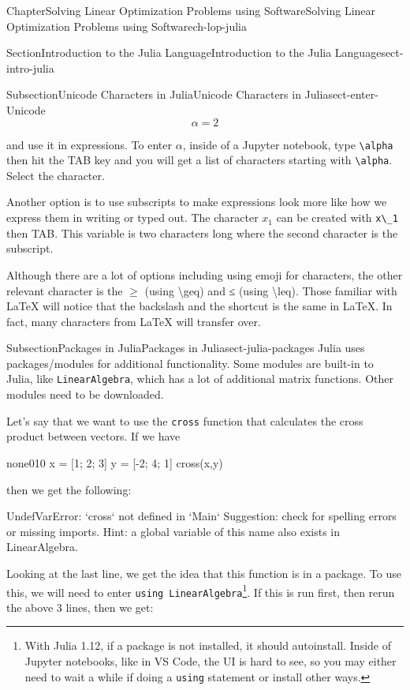 \documentclass[oneside,10pt,]{book}
\newcommand{\mono}[1]{\texttt{#1}}
\numberwithin{equation}{section}
\begin{document}
\begin{chapterptx}{Chapter}{Solving Linear Optimization Problems using Software}{}{Solving Linear Optimization Problems using Software}{}{}{ch-lop-julia}
\begin{sectionptx}{Section}{Introduction to the Julia Language}{}{Introduction to the Julia Language}{}{}{sect-intro-julia}
\begin{subsectionptx}{Subsection}{Unicode Characters in Julia}{}{Unicode Characters in Julia}{}{}{sect-enter-Unicode}
%
\begin{equation*}
\alpha = 2
\end{equation*}
%
\par
and use it in expressions. To enter \(\alpha\), inside of a Jupyter notebook, type \mono{\textbackslash{}alpha} then hit the TAB key and you will get a list of characters starting with \mono{\textbackslash{}alpha}. Select the character.%
\par
Another option is to use subscripts to make expressions look more like how we express them in writing or typed out. The character \(x_1\) can be created with \mono{x\textbackslash{}\_1} then TAB. This variable is two characters long where the second character is the subscript.%
\par
Although there are a lot of options including using emoji for characters, the other relevant character is the \(\geq\) (using \textbackslash{}geq) and ≤ (using \textbackslash{}leq). Those familiar with LaTeX will notice that the backslash and the shortcut is the same in LaTeX. In fact, many characters from LaTeX will transfer over.%
\end{subsectionptx}
%
%
\typeout{************************************************}
\typeout{************************************************}
%
\begin{subsectionptx}{Subsection}{Packages in Julia}{}{Packages in Julia}{}{}{sect-julia-packages}
Julia uses packages\slash{}modules for additional functionality. Some modules are built-in to Julia, like \mono{LinearAlgebra}, which has a lot of additional matrix functions. Other modules need to be downloaded.%
\par
Let's say that we want to use the \mono{cross} function that calculates the cross product between vectors. If we have%
\begin{program}{none}{0}{1}{0}
x = [1; 2; 3]
y = [-2; 4; 1]
cross(x,y)
\end{program}
then we get the following:%
\par
%
\begin{codedisplay}
UndefVarError: `cross` not defined in `Main`
  Suggestion: check for spelling errors or missing imports.
  Hint: a global variable of this name also exists in LinearAlgebra.
\end{codedisplay}
%
\par
Looking at the last line, we get the idea that this function is in a package. To use this, we will need to enter \mono{using LinearAlgebra}\footnote{With Julia 1.12, if a package is not installed, it should autoinstall. Inside of Jupyter notebooks, like in VS Code, the UI is hard to see, so you may either need to wait a while if doing a \mono{using} statement or install other ways.\label{sect-julia-packages-7-2}}. If this is run first, then rerun the above 3 lines, then we get:%

\end{subsectionptx}
\end{sectionptx}
\end{chapterptx}
\end{document}
